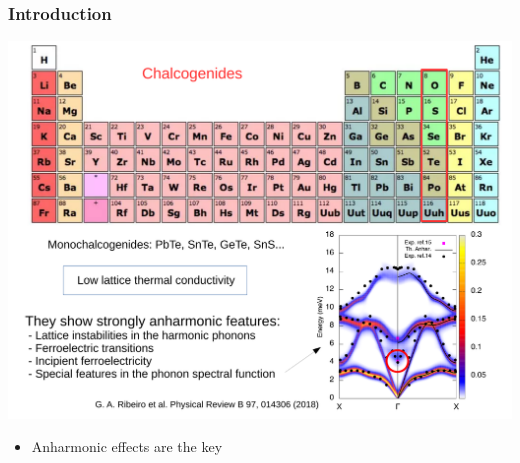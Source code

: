 \documentclass{beamer}
\begin{document}

\begin{frame}

\frametitle{Introduction}
\vspace{-0.25cm}
\begin{center}
\includegraphics[width=0.85\linewidth]{Pictures/INTRO/chalcogenides.pdf}
\end{center}
\vspace{-0.4cm}
\begin{itemize}
 \item Anharmonic effects are the key
\end{itemize}

\end{frame}

\end{document}
